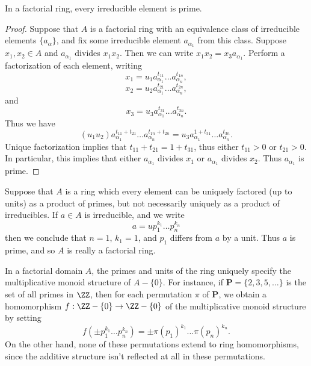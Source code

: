 \begin{theorem}
    In a factorial ring, every irreducible element is prime.
\end{theorem}
\begin{proof}
    Suppose that $A$ is a factorial ring with an equivalence class of irreducible elements $\{ a_\alpha \}$, and fix some irreducible element $a_{\alpha_1}$ from this class. Suppose $x_1,x_2 \in A$ and $a_{\alpha_1}$ divides $x_1x_2$. Then we can write $x_1x_2 = x_3a_{\alpha_1}$. Perform a factorization of each element, writing
    \[ x_1 = u_1 a_{\alpha_1}^{t_{11}} \dots a_{\alpha_n}^{t_{1n}}, \]
    \[ x_2 = u_2 a_{\alpha_1}^{t_{21}} \dots a_{\alpha_n}^{t_{2n}}, \]
    and
    \[ x_3 = u_3 a_{\alpha_1}^{t_{31}} \dots a_{\alpha_n}^{t_{3n}}. \]
    Thus we have
    \[ (u_1u_2) a_{\alpha_1}^{t_{11} + t_{21}} \dots a_{\alpha_n}^{t_{1n} + t_{2n}} = u_3 a_{\alpha_1}^{1 + t_{31}} \dots a_{\alpha_n}^{t_{3n}}. \]
    Unique factorization implies that $t_{11} + t_{21} = 1 + t_{31}$, thus either $t_{11} > 0$ or $t_{21} > 0$. In particular, this implies that either $a_{\alpha_1}$ divides $x_1$ or $a_{\alpha_1}$ divides $x_2$. Thus $a_{\alpha_1}$ is prime.
\end{proof}

\begin{remark}
    Suppose that $A$ is a ring which every element can be uniquely factored (up to units) as a product of primes, but not necessarily uniquely as a product of irreducibles. If $a \in A$ is irreducible, and we write
    \[ a = u p_1^{k_1} \dots p_n^{k_n} \]
    then we conclude that $n = 1$, $k_1 = 1$, and $p_1$ differs from $a$ by a unit. Thus $a$ is prime, and so $A$ is really a factorial ring.
\end{remark}

In a factorial domain $A$, the primes and units of the ring uniquely specify the multiplicative monoid structure of $A - \{ 0 \}$. For instance, if $\mathbf{P} = \{ 2, 3, 5, \dots \}$ is the set of all primes in $\ZZ$, then for each permutation $\pi$ of $\mathbf{P}$, we obtain a homomorphism $f: \ZZ - \{ 0 \} \to \ZZ - \{ 0 \}$ of the multiplicative monoid structure by setting
%
\[ f(\pm p_1^{k_1} \dots p_n^{k_n}) = \pm \pi(p_1)^{k_1} \dots \pi(p_n)^{k_n}. \]
%
On the other hand, none of these permutations extend to ring homomorphisms, since the additive structure isn't reflected at all in these permutations.







